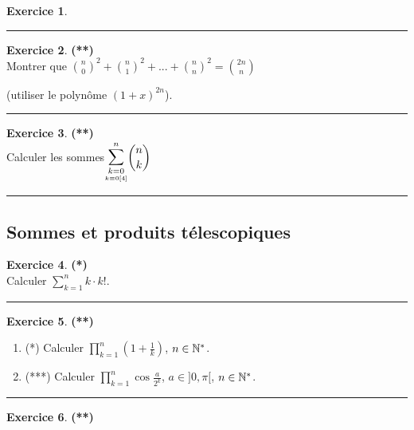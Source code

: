 \documentclass[a4paper,11pt]{article}
\theoremstyle{definition}
\newtheorem{exo}{Exercice} %
\begin{document}
\begin{minipage}[t]{1\linewidth}
\begin{minipage}[t]{0.48\linewidth}
\begin{exo}
			
			\centering
			\rule{1\linewidth}{0.6pt}
		\end{exo}
		
		
		
		\begin{exo}\textbf{(**)}\quad\\[0.2cm]
			Montrer que $\binom{n}{0}^2 +\binom{n}{1}^2 + ... +\binom{n}{n}^2 =\binom{2n}{n}$
			
			 (utiliser le polynôme $(1+x)^{2n}$).
			
			\centering
			\rule{1\linewidth}{0.6pt}
		\end{exo}
	
		\begin{exo}\textbf{(**)}\quad\\[0.2cm]
			Calculer les sommes\quad  $\displaystyle\mathlarger\sum\limits_{\underset{k\equiv0[4]}{k=0}}^{n}{ {n \choose k}}$
			
			
			\centering
			\rule{1\linewidth}{0.6pt}
		\end{exo}
	
		\subsection*{Sommes et produits télescopiques}
		
	
		\begin{exo}\textbf{(*)}\quad\\[0.2cm]
		Calculer $\sum_{k=1}^n k\cdot k!$.
		
		
		
		\centering
		\rule{1\linewidth}{0.6pt}
	\end{exo}
	
		\begin{exo}\textbf{(**)}\quad\\[0.2cm]
				\begin{enumerate}
				\item (*) Calculer $\prod_{k=1}^{n}(1+\frac{1}{k})$, $n\in\mathbb{N}^*$.
				\item (***) Calculer $\prod_{k=1}^{n}\cos\frac{a}{2^k}$, $a\in]0,\pi[$, $n\in\mathbb{N}^*$.
			\end{enumerate}
			
			
			
			\centering
			\rule{1\linewidth}{0.6pt}
		\end{exo}
	

	
		
		\begin{exo}\textbf{(**)}\quad\\[0.2cm]
			

\end{exo}
\end{minipage}
\end{minipage}
\end{document}
